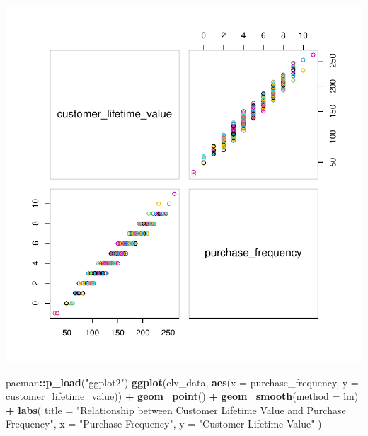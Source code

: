 \documentclass[
]{article}
\newenvironment{Shaded}{\begin{snugshade}}{\end{snugshade}}
\newcommand{\AttributeTok}[1]{\textcolor[rgb]{0.13,0.29,0.53}{#1}}
\newcommand{\FunctionTok}[1]{\textcolor[rgb]{0.13,0.29,0.53}{\textbf{#1}}}
\newcommand{\NormalTok}[1]{#1}
\newcommand{\SpecialCharTok}[1]{\textcolor[rgb]{0.81,0.36,0.00}{\textbf{#1}}}
\newcommand{\StringTok}[1]{\textcolor[rgb]{0.31,0.60,0.02}{#1}}
\begin{document}
\includegraphics{1_simple_linear_regression_files/figure-latex/scatter_plot_1-1.pdf}

\begin{Shaded}
\begin{Highlighting}[]
\NormalTok{pacman}\SpecialCharTok{::}\FunctionTok{p\_load}\NormalTok{(}\StringTok{"ggplot2"}\NormalTok{)}
\FunctionTok{ggplot}\NormalTok{(clv\_data,}
       \FunctionTok{aes}\NormalTok{(}\AttributeTok{x =}\NormalTok{ purchase\_frequency, }\AttributeTok{y =}\NormalTok{ customer\_lifetime\_value)) }\SpecialCharTok{+} 
  \FunctionTok{geom\_point}\NormalTok{() }\SpecialCharTok{+}
  \FunctionTok{geom\_smooth}\NormalTok{(}\AttributeTok{method =}\NormalTok{ lm) }\SpecialCharTok{+}
  \FunctionTok{labs}\NormalTok{(}
    \AttributeTok{title =} \StringTok{"Relationship between Customer Lifetime Value and Purchase Frequency"}\NormalTok{,}
    \AttributeTok{x =} \StringTok{"Purchase Frequency"}\NormalTok{,}
    \AttributeTok{y =} \StringTok{"Customer Lifetime Value"}
\NormalTok{  )}
\end{Highlighting}
\end{Shaded}
\end{document}
